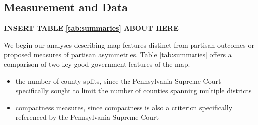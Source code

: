         \subsection*{Measurement and Data}
	
		\begin{center}\textbf{INSERT TABLE \ref{tab:summaries} ABOUT HERE} \end{center}
\par
    We begin our analyses describing map features distinct from partisan outcomes or proposed measures of partisan asymmetries. Table \ref{tab:summaries} offers a comparison of two key good government features of the map.
%
	\begin{itemize}
	    \item the number of county splits, since the Pennsylvania Supreme Court specifically sought to limit the number of counties spanning multiple districts
	    \item compactness measures, since compactness is also a criterion specifically referenced by the Pennsylvania Supreme Court
	\end{itemize}
%
\par
